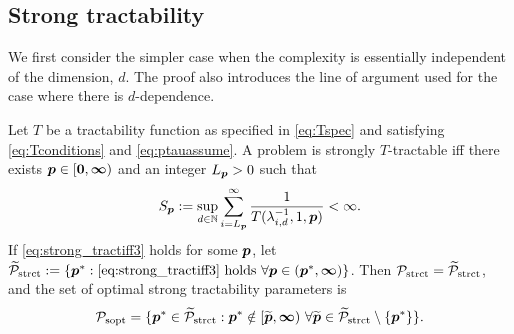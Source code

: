 \documentclass[11pt,a4paper]{article}
\newcommand{\peter}[1]{\begingroup\color{purple}#1\endgroup}
\begin{document}
\subsection{Strong tractability}

We first consider the simpler case when the complexity is essentially independent of the dimension, $d$.  The proof also introduces the line of argument used for the case where there is $d$-dependence.

\begin{theorem}\label{thm_main_strong_tract2}
Let $T$ be a tractability function as specified in \eqref{eq:Tspec} and satisfying \eqref{eq:Tconditions} and \eqref{eq:ptauassume}.  A problem is strongly $T$-tractable iff there exists $\boldsymbol{p} \in [\boldsymbol{0}, \boldsymbol{\infty})$ and an integer $L_{\boldsymbol{p}} > 0$ such that
\begin{equation} \label{eq:strong_tractiff3}
     S_{\boldsymbol{p}}:=\sup_{d \in \mathbb{N}} \sum_{i = L_{\boldsymbol{p}}}^\infty \frac{1}{T(\lambda_{i,d}^{-1},1,\boldsymbol{p})} < \infty.
\end{equation}
If \eqref{eq:strong_tractiff3} holds for some $\boldsymbol{p}$, let  $\widetilde{\mathcal{P}}_{\textup{strct}} : = \{\boldsymbol{p}^* : \eqref{eq:strong_tractiff3} \text{ holds }\forall \boldsymbol{p} \in (\boldsymbol{p}^*,\boldsymbol{\infty})\}$.  Then $\mathcal{P}_{\textup{strct}} = \widetilde{\mathcal{P}}_{\textup{strct}}$, and the set of optimal strong tractability parameters is
\[
	\mathcal{P}_{\textup{sopt}} =
	\{\boldsymbol{p}^* \in \widetilde{\mathcal{P}}_{\textup{strct}} :  \boldsymbol{p}^* \notin [\widetilde{\boldsymbol{p}},\boldsymbol{\infty}) \ \forall \widetilde{\boldsymbol{p}}\in  \widetilde{\mathcal{P}}_{\textup{strct}} \setminus \{\boldsymbol{p}^*\} \}.
\]
\end{theorem}
\end{document}
